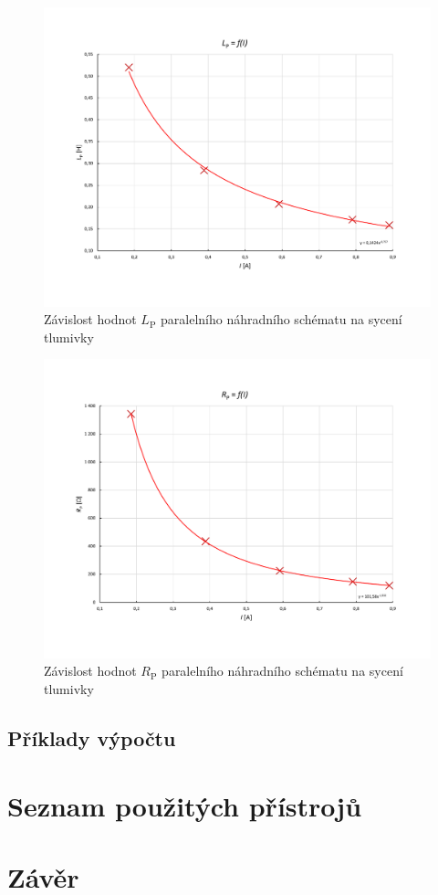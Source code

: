 \documentclass[a4paper, czech]{article}
\begin{document}
\begin{figure}[H]
    \centering
    \includegraphics[width=\textwidth, trim={0 3cm 0 3cm}]{grafy/9A_graf2.pdf}
    \caption{Závislost hodnot $L_\text{P}$ paralelního náhradního schématu na sycení tlumivky}
\end{figure}

\begin{figure}[H]
    \centering
    \includegraphics[width=\textwidth, trim={0 3cm 0 3cm}]{grafy/9A_graf1.pdf}
    \caption{Závislost hodnot $R_\text{P}$ paralelního náhradního schématu na sycení tlumivky}
\end{figure}

\subsection{Příklady výpočtu}

\section{Seznam použitých přístrojů}

\section{Závěr}
\end{document}
